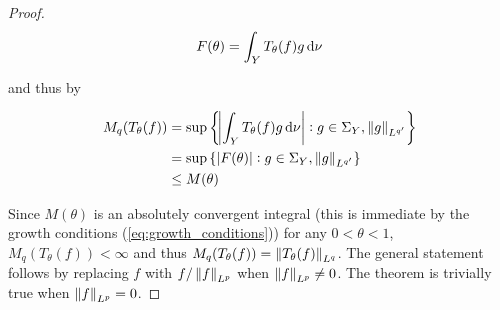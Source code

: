 \begin{proof}
	\begin{equation*}
		F(\theta) = \int_Y T_\theta(f)g\mathop{}\!\mathrm{d}\nu
	\end{equation*}

	\noindent and thus by \cite[189]{folland:real_analysis:1999} 

	\begin{gather*}
		\begin{aligned}
			M_q(T_\theta(f)) &= \sup\cbr[3]{ \abs[3]{ \int_Y T_\theta(f) g \d \nu} : g \in \Sigma_Y, \norm[0]{g}_{L^{q'}}}\\
			&= \sup\cbr[0]{ \abs[0]{ F(\theta)} : g \in \Sigma_Y, \norm[0]{ g }_{L^{q'}}}\\
			&\leq M(\theta)
		\end{aligned}
	\end{gather*}

	Since $M(\theta)$ is an absolutely convergent integral (this is immediate by the growth conditions (\ref{eq:growth_conditions})) for any $0 < \theta < 1$, $M_q(T_\theta(f)) < \infty$ and thus $M_q(T_\theta(f)) = \norm[0]{ T_\theta(f)}_{L^q}$. The general statement follows by replacing $f$ with $f/\norm[0]{ f}_{L^p}$ when $\norm[0]{f}_{L^p} \neq 0$. The theorem is trivially true when $\norm[0]{ f}_{L^p} = 0$.
\end{proof}
